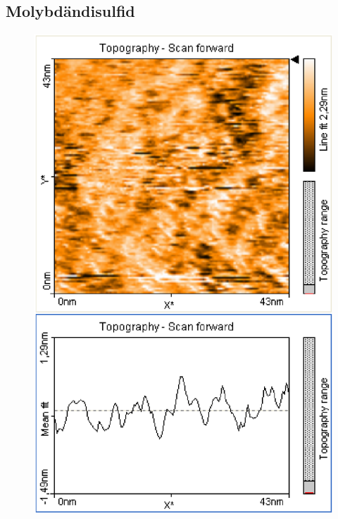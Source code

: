 \documentclass[12pt]{article}
\begin{document}
\subsection{Molybdändisulfid}

\begin{figure}[H]  
\begin{minipage}{0.4\linewidth}
\centering
\includegraphics[width=0.9\linewidth]{../plot/data/mos2/mos2.eps}
\end{minipage}
\begin{minipage}{0.2\linewidth}
\centering
\end{minipage}
\begin{minipage}{0.4\linewidth}
\centering

\end{minipage}
\end{figure}
\end{document}
